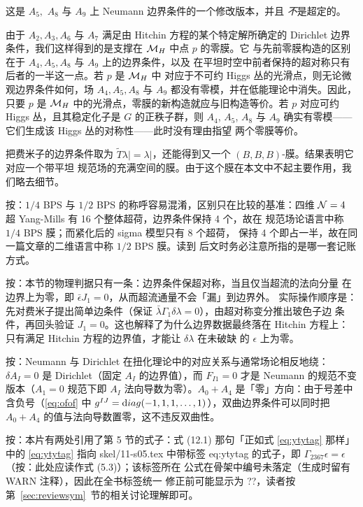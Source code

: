 这是 $A_5,$ $A_8$ 与 $A_9$ 上 Neumann 边界条件的一个修改版本，并且
\emph{不}是超定的。

由于 $A_2,A_3, A_6$ 与 $A_7$ 满足由 Hitchin 方程的某个特定解所确定的
Dirichlet 边界条件，我们这样得到的是支撑在 $\MH$ 中点 $p$ 的零膜。它
与先前零膜构造的区别在于 $A_4,A_5,A_8$ 与 $A_9$ 上的边界条件，以及
在平坦时空中前者保持的超对称只有后者的一半这一点。若 $p$ 是 $\MH$ 中
对应于不可约 Higgs 丛的光滑点，则无论微观边界条件如何，场
$A_4,A_5,A_8$ 与 $A_9$ 都没有零模，并在低能理论中消失。因此，只要 $p$
是 $\MH$ 中的光滑点，零膜的新构造就应与旧构造等价。若 $p$ 对应可约
Higgs 丛，且其稳定化子是 $G$ 的正秩子群，则 $A_4$, $A_5$, $A_8$ 与
$A_9$ 确实有零模——它们生成该 Higgs 丛的对称性——此时没有理由指望
两个零膜等价。

把费米子的边界条件取为 $\tilde T\lambda\vert =
\lambda\vert$，还能得到又一个 $(B,B,B)$-膜。结果表明它对应一个带平坦
规范场的充满空间的膜。由于这个膜在本文中不起主要作用，我们略去细节。

\begin{yizhu}[易错点]
按：$1/4$ BPS 与 $1/2$ BPS 的称呼容易混淆，区别只在比较的基准：四维
${\EUN}=4$ 超 Yang-Mills 有 16 个整体超荷，边界条件保持 4 个，故在
规范场论语言中称 $1/4$ BPS 膜；而紧化后的 sigma 模型只有 8 个超荷，
保持 4 个即占一半，故在同一篇文章的二维语言中称 $1/2$ BPS 膜。读到
后文时务必注意所指的是哪一套记账方式。
\end{yizhu}

\begin{yizhu}[物理图像]
按：本节的物理判据只有一条：边界条件保超对称，当且仅当超流的法向分量
在边界上为零，即 $\bar\epsilon J_1=0$，从而超流通量不会「漏」到边界外。
实际操作顺序是：先对费米子提出简单边条件（保证
${\bar\lambda}\Gamma_1\delta\lambda=0$），由超对称变分推出玻色子边
条件，再回头验证 $J_1=0$。这也解释了为什么边界数据最终落在 Hitchin
方程上：只有满足 Hitchin 方程的边界值，才能让 $\delta\lambda$ 在未破缺
的 $\epsilon$ 上为零。
\end{yizhu}

\begin{yizhu}[易错点]
按：Neumann 与 Dirichlet 在扭化理论中的对应关系与通常场论相反地绕：
$\delta A_I=0$ 是 Dirichlet（固定 $A_I$ 的边界值），而 $F_{I1}=0$ 才是
Neumann 的规范不变版本（$A_1=0$ 规范下即 $A_I$ 法向导数为零）。$A_0+A_4$
是「零」方向：由于号差中含负号（\eqref{eq:ofof} 中
$g^{IJ}={\rm diag}(-1,1,1,\dots,1)$），双曲边界条件可以同时把
$A_0+A_4$ 的值与法向导数置零，这不违反双曲性。
\end{yizhu}

\begin{yizhu}[含糊点拨]
按：本片有两处引用了第 5 节的式子：式 (12.1) 那句「正如式
\eqref{eq:ytytag} 那样」中的 \eqref{eq:ytytag} 指向
skel/11-s05.tex 中带标签 eq:ytytag 的式子，即
$\Gamma_{2367}\epsilon=\epsilon$（按：此处应读作式 (5.3)）；该标签所在
公式在骨架中编号未落定（生成时留有 WARN 注释），因此在全书标签统一
修正前可能显示为 ??，读者按第~\ref{sec:reviewsym}~节的相关讨论理解即可。
\end{yizhu}

